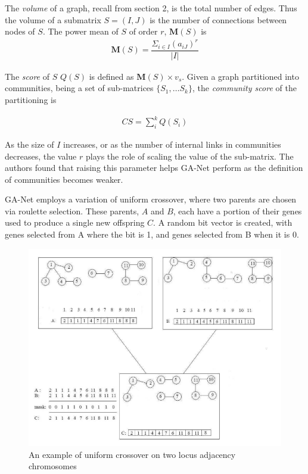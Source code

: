 The \textit{volume} of a graph, recall from section 2, is the total number of edges. Thus the volume of a submatrix $S = (I, J)$ is the number of connections between nodes of $S$. The power mean of $S$ of order $r$, $\mathbf{M}(S)$ is  
\begin{align*}
\mathbf{M}(S)=\dfrac{\Sigma_{i\in I}(a_{iJ})^r}{|I|}
\end{align*}

The \textit{score} of $S$ $Q(S)$ is defined as $\mathbf{M}(S)\times v_s$. Given a graph partitioned into communities, being a set of sub-matrices  $\{S_1,\dots S_k\}$, the \textit{community score} of the partitioning is

\begin{align*}
CS=\sum\limits_{i}^{k}Q(S_i)
\end{align*}

As the size of $I$ increases, or as the number of internal links in communities decreases, the value $r$ plays the role of scaling the value of the sub-matrix. The authors found that raising this parameter helps GA-Net perform as the definition of communities becomes weaker.

GA-Net employs a variation of uniform crossover, where two parents are chosen via roulette selection. These parents, $A$ and $B$, each have a portion of their genes used to produce a single new offspring $C$. A random bit vector is created, with genes selected from A where the bit is 1, and genes selected from B when it is 0.

\begin{figure}[!htb]
	\begin{center}
		\includegraphics[scale=.8]{images/uni_graph.png}
	\end{center}
	\caption{An example of uniform crossover on two locus adjacency chromosomes}
	\label{logo}
\end{figure}



